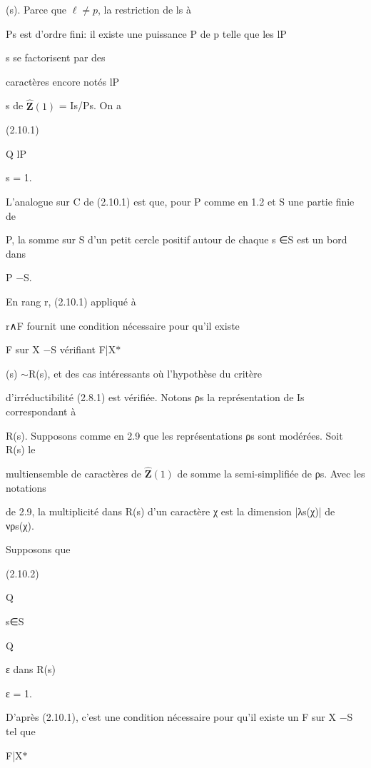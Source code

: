 \documentclass[11pt]{article}
\begin{document}
\noindent (s). Parce que \(\ell\ne p\), la restriction de ls à\par
\noindent Ps est d’ordre fini: il existe une puissance P de p telle que les lP\par
\noindent s se factorisent par des\par
\noindent caractères encore notés lP\par
\noindent s de \(\widehat{\mathbf Z}(1)\) = Is/Ps. On a\par
\noindent (2.10.1)\par
\noindent Q lP\par
\noindent s = 1.\par
\noindent L’analogue sur C de (2.10.1) est que, pour P comme en 1.2 et S une partie finie de\par
\noindent P, la somme sur S d’un petit cercle positif autour de chaque s ∈S est un bord dans\par
\noindent P −S.\par
\noindent En rang r, (2.10.1) appliqué à\par
\noindent r∧F fournit une condition nécessaire pour qu’il existe\par
\noindent F sur X −S vérifiant F|X\(*\)\par
\noindent (s) \(\sim\)R(s), et des cas intéressants où l’hypothèse du critère\par
\noindent d’irréductibilité (2.8.1) est vérifiée. Notons ρs la représentation de Is correspondant à\par
\noindent R(s). Supposons comme en 2.9 que les représentations ρs sont modérées. Soit R(s) le\par
\noindent multiensemble de caractères de \(\widehat{\mathbf Z}(1)\) de somme la semi-simplifiée de ρs. Avec les notations\par
\noindent de 2.9, la multiplicité dans R(s) d’un caractère χ est la dimension |λs(χ)| de νρs(χ).\par
\noindent Supposons que\par
\noindent (2.10.2)\par
\noindent Q\par
\noindent s∈S\par
\noindent Q\par
\noindent ε dans R(s)\par
\noindent ε = 1.\par
\medskip
\noindent D’après (2.10.1), c’est une condition nécessaire pour qu’il existe un F sur X −S tel que\par
\noindent F|X\(*\)\par
\end{document}
